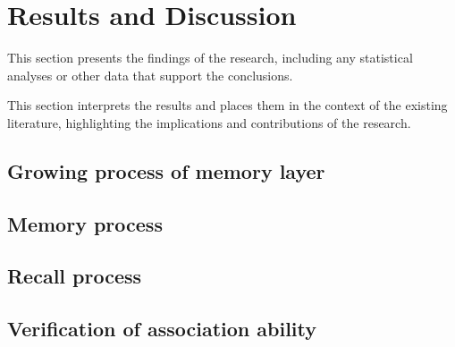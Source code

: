 \chapter{Results and Discussion}
This section presents the findings of the research, including any statistical
analyses or other data that support the conclusions.

This section interprets the results and places them in the context of the
existing literature, highlighting the implications and contributions of the
research.
\section{Growing process of memory layer}
\section{Memory process}
\section{Recall process}
\section{Verification of association ability}
